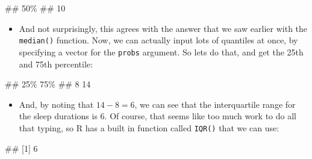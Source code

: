 \documentclass[
]{book}
\newenvironment{Shaded}{\begin{snugshade}}{\end{snugshade}}
\newcommand{\AttributeTok}[1]{\textcolor[rgb]{0.77,0.63,0.00}{#1}}
\newcommand{\DecValTok}[1]{\textcolor[rgb]{0.00,0.00,0.81}{#1}}
\newcommand{\FunctionTok}[1]{\textcolor[rgb]{0.00,0.00,0.00}{#1}}
\newcommand{\NormalTok}[1]{#1}
\newcommand{\SpecialCharTok}[1]{\textcolor[rgb]{0.00,0.00,0.00}{#1}}
\providecommand{\tightlist}{%
  \setlength{\itemsep}{0pt}\setlength{\parskip}{0pt}}
\begin{document}
\begin{Shaded}
\begin{Highlighting}[]
\NormalTok{\#\# 50\% }
\NormalTok{\#\#  10}
\end{Highlighting}
\end{Shaded}

\begin{itemize}
\tightlist
\item
  And not surprisingly, this agrees with the answer that we saw earlier with the \texttt{median()} function. Now, we can actually input lots of quantiles at once, by specifying a vector for the \texttt{probs} argument. So lets do that, and get the 25th and 75th percentile:
\end{itemize}

\begin{Shaded}
\end{Shaded}

\begin{Shaded}
\begin{Highlighting}[]
\NormalTok{\#\# 25\% 75\% }
\NormalTok{\#\#   8  14}
\end{Highlighting}
\end{Shaded}

\begin{itemize}
\tightlist
\item
  And, by noting that \(14 - 8 = 6\), we can see that the interquartile range for the sleep durations is 6. Of course, that seems like too much work to do all that typing, so R has a built in function called \texttt{IQR()} that we can use:
\end{itemize}

\begin{Shaded}
\end{Shaded}

\begin{Shaded}
\begin{Highlighting}[]
\NormalTok{\#\# [1] 6}
\end{Highlighting}
\end{Shaded}
\end{document}
